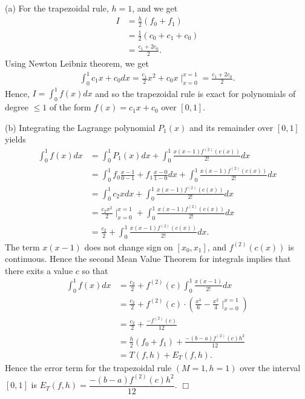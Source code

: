 \documentclass[UTF8,12pt,hyperref]{ctexart}
\newenvironment{solve}[1][\color{blue}\bf Solve]{\begin{trivlist}
\item[\hskip \labelsep {\color{blue}\bfseries
#1}]}{\hfill$\Box$\end{trivlist}}
\begin{document}
\begin{solve}
  (a) For the trapezoidal rule, $h=1$, and we get
  \begin{align*}
    I &=\frac{h}{2}(f_0+f_1)\\
    &= \frac{1}{2}(c_0+c_1+c_0)\\
    &= \frac{c_1+2c_0}{2}.
  \end{align*}
  Using Newton Leibniz theorem, we get 
  \begin{align*}
    \int_{0}^{1} c_1x+c_0dx = \frac{c_1}{2}x^2+c_0x\mid_{x=0}^{x=1}=\frac{c_1+2c_0}{2}.
  \end{align*}
  Hence, $I=\int_{0}^{1}f(x)dx$ and so the trapezoidal rule is exact for polynomials of 
  degree $\leqslant 1$ of the form $f(x) =c_1x +c_0$ over $[0, 1]$.
  \par
  (b) Integrating the Lagrange polynomial $P_1(x)$ and its remainder over $[0,1]$ yields
  \begin{align*}
    \int_{0}^{1} f(x) dx &= \int_{0}^{1} P_1(x)dx + \int_{0}^{1} \frac{x(x-1)f^{(2)}(c(x))}{2!}dx\\
    &=\int_{0}^{1} f_0\frac{x-1}{0-1}+f_1\frac{x-0}{1-0}dx + \int_{0}^{1} \frac{x(x-1)f^{(2)}(c(x))}{2!}dx\\
    &=\int_{0}^{1} c_2xdx + \int_{0}^{1} \frac{x(x-1)f^{(2)}(c(x))}{2!}dx\\
    &=\frac{c_2x^2}{2}\mid_{x=0}^{x=1} + \int_{0}^{1} \frac{x(x-1)f^{(2)}(c(x))}{2!}dx\\
    &=\frac{c_2}{2} + \int_{0}^{1} \frac{x(x-1)f^{(2)}(c(x))}{2!}dx.
  \end{align*}
  The term $x(x-1)$ does not change sign on $[x_0,x_1]$, and $f^{(2)}(c(x))$ is continuous. Hence 
  the second Mean Value Theorem for integrals implies that there exits a value $c$ so that 
  \begin{align*}
    \int_{0}^{1} f(x)dx &= \frac{c_2}{2}+f^{(2)}(c)\int_{0}^{1} \frac{x(x-1)}{2!}dx\\
    &=\frac{c_2}{2} + f^{(2)}(c)\cdot (\frac{x^3}{6}-\frac{x^2}{4}\mid_{x=0}^{x=1})\\
    &=\frac{c_2}{2} + \frac{-f^{(2)}(c)}{12}\\
    &=\frac{h}{2}(f_0+f_1) + \frac{-(b-a)f^{(2)}(c)h^2}{12}\\
    &=T(f,h)+E_{T}(f,h).
  \end{align*}
  Hence the error term for the trapezoidal rule $(M =1, h =1)$ over the interval $[0, 1]$ is
  $E_T(f, h)=\dfrac{-(b-a)f^{(2)}(c)h^2}{12}$. 
\end{solve}
\end{document}
